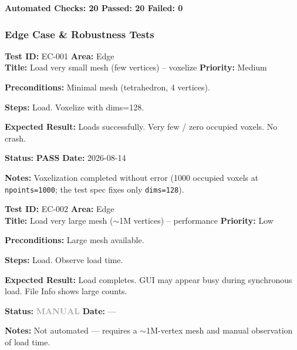 \documentclass[12pt,a4paper]{article}
\newcommand{\pass}{\textcolor{paleogreen}{\textbf{PASS}}}
\newcommand{\manual}{\textcolor{darkgray}{\textbf{MANUAL}}}
\newcommand{\testheader}[4]{%
  \smallskip
  \noindent\textbf{Test ID:} #1 \hfill \textbf{Area:} #2 \\
  \textbf{Title:} #3 \hfill \textbf{Priority:} #4
}
\newenvironment{testbody}{%
  \begin{description}[leftmargin=2em,style=nextline]
}{%
  \end{description}
  \smallskip
}
\begin{document}
\begin{center}
\large\textbf{Automated Checks: 20 \hspace{1em} Passed: 20 \hspace{1em} Failed: 0}
\end{center}

\newpage

\subsubsection{Edge Case \& Robustness Tests}

\testheader{EC-001}{Edge}{Load very small mesh (few vertices) -- voxelize}{Medium}
\begin{testbody}
  \item[\textbf{Preconditions:}] Minimal mesh (tetrahedron, 4 vertices).
  \item[\textbf{Steps:}] Load. Voxelize with dims=128.
  \item[\textbf{Expected Result:}] Loads successfully. Very few / zero occupied
        voxels. No crash.
  \item[\textbf{Status:}] \pass{} \hspace{1em} \textbf{Date:} 2026-08-14
  \item[\textbf{Notes:}] Voxelization completed without error (1000 occupied
        voxels at \texttt{npoints=1000}; the test spec fixes only
        \texttt{dims=128}).
\end{testbody}

\testheader{EC-002}{Edge}{Load very large mesh ($\sim$1M vertices) -- performance}{Low}
\begin{testbody}
  \item[\textbf{Preconditions:}] Large mesh available.
  \item[\textbf{Steps:}] Load. Observe load time.
  \item[\textbf{Expected Result:}] Load completes. GUI may appear busy during
        synchronous load. File Info shows large counts.
  \item[\textbf{Status:}] \manual{} \hspace{1em} \textbf{Date:} ---
  \item[\textbf{Notes:}] Not automated --- requires a $\sim$1M-vertex mesh and
        manual observation of load time.
\end{testbody}
\end{document}

